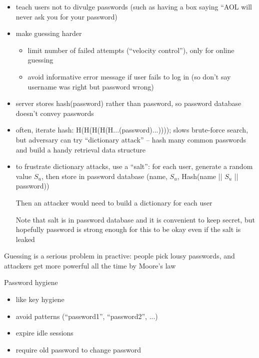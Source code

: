 \begin{itemize}
    \item teach users not to divulge passwords (such as having a box saying
            ``AOL will never ask you for your password)
    \item make guessing harder
    \begin{itemize}
        \item limit number of failed attempts (``velocity control''), only for
                online guessing
        \item avoid informative error message if user fails to log in (so don't
                say username was right but password wrong)
    \end{itemize}
    \item server stores hash(password) rather than password, so password
            database doesn't convey passwords
    \item often, iterate hash: H(H(H(H(H...(password)...)))); slows brute-force
            search, but adversary can try ``dictionary attack'' -- hash many
            common passwords and build a handy retrieval data structure
    \item to frustrate dictionary attacks, use a ``salt'': for each user,
            generate a random value $S_u$, then store in password database
            (name, $S_u$, Hash(name || $S_u$ || password))

            Then an attacker would need to build a dictionary for each user

            Note that salt is in password database and it is convenient to keep
            secret, but hopefully password is strong enough for this to be okay
            even if the salt is leaked
\end{itemize}
Guessing is a serious problem in practive: people pick lousy passwords, and
attackers get more powerful all the time by Moore's law


Password hygiene
\begin{itemize}
    \item like key hygiene
    \item avoid patterns (``password1'', ``password2'', ...)
    \item expire idle sessions
    \item require old password to change password
\end{itemize}

